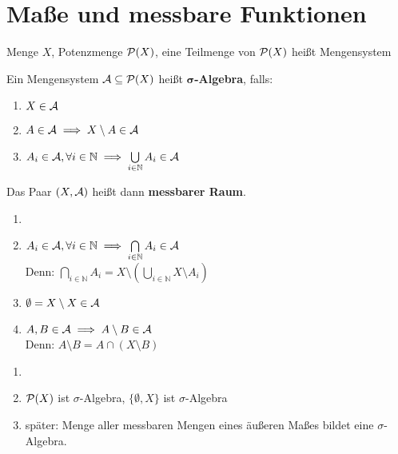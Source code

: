 \chapter{Maße und messbare Funktionen}

  \begin{notation}
    Menge $X$, Potenzmenge $\mathcal{P}(X)$, eine Teilmenge von $\mathcal{P}(X)$ heißt Mengensystem
  \end{notation}

  \begin{definition}
    Ein Mengensystem $\mathcal{A} \subseteq \mathcal{P}(X)$ heißt \textbf{$\bm{\sigma}$-Algebra}, falls:
    \begin{enumerate}[label=(\roman*)]
      \item $X \in \mathcal{A}$
      \item $A \in \mathcal{A} \implies X \setminus A \in \mathcal{A}$
      \item $A_i \in \mathcal{A}, \forall i \in \mathbb{N} \implies \bigcup\limits_{i \in \mathbb{N}} A_i \in \mathcal{A}$
    \end{enumerate}
    Das Paar $(X, \mathcal{A})$ heißt dann \textbf{messbarer Raum}.
  \end{definition}

  \begin{remark}
    \begin{enumerate}
      \item[]
      \item $A_i \in \mathcal{A}, \forall i \in \mathbb{N} \implies \bigcap\limits_{i \in \mathbb{N}} A_i \in \mathcal{A}$\\
            Denn: $\bigcap\limits_{i \in \mathbb{N}} A_i = X \setminus (\bigcup\limits_{i \in \mathbb{N}} X \setminus A_i)$
      \item $\emptyset = X \setminus X \in \mathcal{A}$
      \item $A,B \in \mathcal{A} \implies A \setminus B \in \mathcal{A}$\\
            Denn: $A \setminus B = A \cap (X \setminus B)$
    \end{enumerate}
  \end{remark}

  \begin{example}
    \begin{enumerate}
      \item[]
      \item $\mathcal{P}(X)$ ist $\sigma$-Algebra, $\{\emptyset, X\}$ ist $\sigma$-Algebra
      \item später: Menge aller messbaren Mengen eines äußeren Maßes bildet eine $\sigma$-Algebra.
    \end{enumerate}
  \end{example}
  
